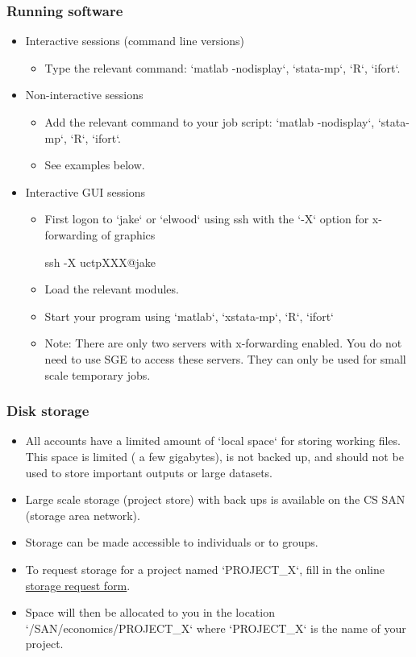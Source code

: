 \documentclass{beamer}
\begin{document}
\begin{frame}
\frametitle{Running software}
\begin{itemize}
\item Interactive sessions (command line versions)
\begin{itemize}
\item Type the relevant command: `matlab -nodisplay`, `stata-mp`, `R`, `ifort`.
\end{itemize}
\item Non-interactive sessions
\begin{itemize}
\item Add the relevant command to your job script: `matlab -nodisplay`, `stata-mp`, `R`, `ifort`.
\item See examples below.
\end{itemize}
\item Interactive GUI sessions
\begin{itemize}
\item First logon to `jake` or `elwood` using ssh with the `-X` option for x-forwarding of graphics
\begin{semiverbatim}
ssh -X uctpXXX@jake
\end{semiverbatim}
\item Load the relevant modules.
\item Start your program using `matlab`, `xstata-mp`, `R`, `ifort`
\item Note: There are only two servers with x-forwarding enabled. You do not need to use SGE to access these servers. They can only be used for small scale temporary jobs.
\end{itemize}
\end{itemize}
\end{frame}

\begin{frame}
\frametitle{Disk storage}
\begin{itemize}
\item All accounts have a limited amount of `local space` for storing working files. This space is limited ( a few gigabytes), is not backed up, and should not be used to store important outputs or large datasets.
\item Large scale storage (project store) with back ups is available on the CS SAN (storage area network).
\item Storage can be made accessible to individuals or to groups. 
\item To request storage for a project named `PROJECT\_X`, fill in the online \textcolor{blue}{\href{http://hpc.cs.ucl.ac.uk/file\_systems\_storage/cluster\_storage\_request\_form}{storage request form}}.
\item Space will then be allocated to you in the location `/SAN/economics/PROJECT\_X` where `PROJECT\_X` is the name of your project.
\end{itemize}
\end{frame}
\end{document}
